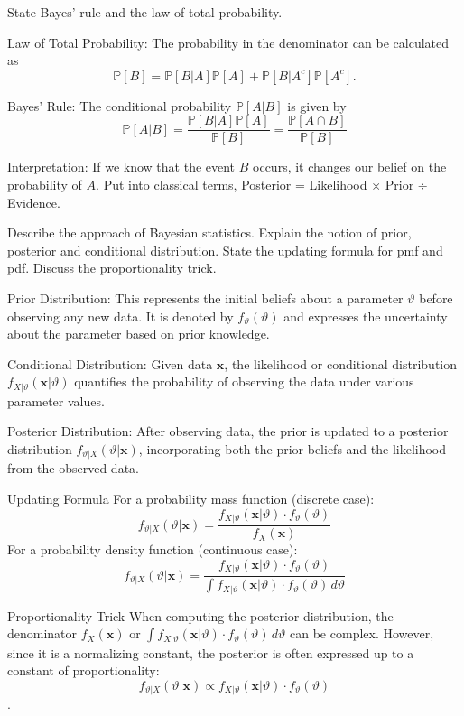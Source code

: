 State Bayes’ rule and the law of total probability.

Law of Total Probability:
The probability in the denominator can be calculated as
\[
\mathbb{P}[B] = \mathbb{P}[B|A]\mathbb{P}[A] + \mathbb{P}[B|A^c]\mathbb{P}[A^c].
\]

Bayes' Rule:
The conditional probability \(\mathbb{P}[A|B]\) is given by
\[
  \mathbb{P}[A|B] = \frac{\mathbb{P}[B|A]\mathbb{P}[A]}{\mathbb{P}[B]} = \frac{\mathbb{P}[A \cap B]}{\mathbb{P}[B]}
\]

Interpretation:
If we know that the event \(B\) occurs, it changes our belief on the probability of \(A\).
Put into classical terms, Posterior = Likelihood × Prior ÷ Evidence.


Describe the approach of Bayesian statistics. Explain the notion of prior, posterior
and conditional distribution. State the updating formula for pmf and pdf. Discuss
the proportionality trick.

Prior Distribution: 
This represents the initial beliefs about a parameter \(\vartheta\) before observing any new data. 
It is denoted by \(f_\vartheta(\vartheta)\) and expresses the uncertainty about the parameter based on prior knowledge.

Conditional Distribution: Given data \(\mathbf{x}\), the likelihood or conditional distribution \(f_{X|\vartheta}(\mathbf{x}|\vartheta)\) quantifies the probability of observing the data under various parameter values.

 Posterior Distribution: After observing data, the prior is updated to a posterior distribution \(f_{\vartheta|X}(\vartheta|\mathbf{x})\), incorporating both the prior beliefs and the likelihood from the observed data.

Updating Formula
For a probability mass function (discrete case):
\[
f_{\vartheta|X}(\vartheta|\mathbf{x}) = \frac{f_{X|\vartheta}(\mathbf{x}|\vartheta) \cdot f_\vartheta(\vartheta)}{f_X(\mathbf{x})}
\]
For a probability density function (continuous case):
\[
f_{\vartheta|X}(\vartheta|\mathbf{x}) = \frac{f_{X|\vartheta}(\mathbf{x}|\vartheta) \cdot f_\vartheta(\vartheta)}{\int f_{X|\vartheta}(\mathbf{x}|\vartheta) \cdot f_\vartheta(\vartheta) \, d\vartheta}
\]

Proportionality Trick
When computing the posterior distribution, the denominator \(f_X(\mathbf{x})\) or \(\int f_{X|\vartheta}(\mathbf{x}|\vartheta) \cdot f_\vartheta(\vartheta) \, d\vartheta\) can be complex. However, since it is a normalizing constant, the posterior is often expressed up to a constant of proportionality:
\[
f_{\vartheta|X}(\vartheta|\mathbf{x}) \propto f_{X|\vartheta}(\mathbf{x}|\vartheta) \cdot f_\vartheta(\vartheta)
\].


